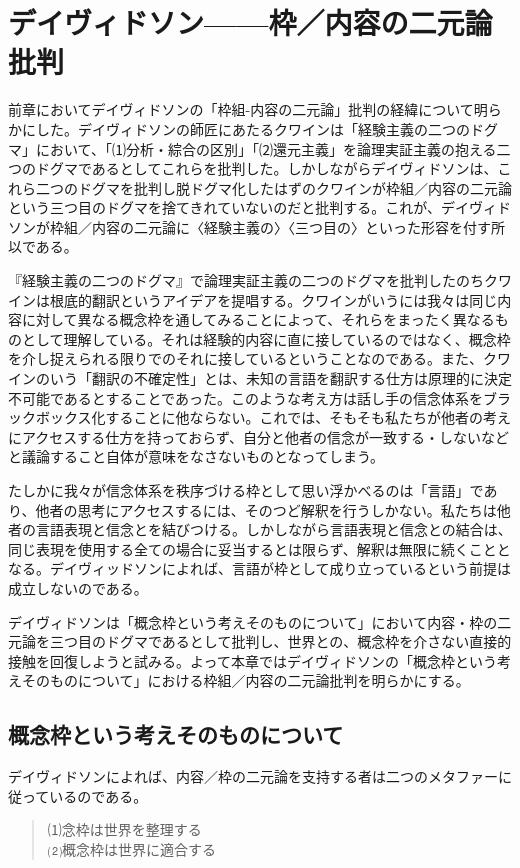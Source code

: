 \documentclass[b5j,twoside,twocolumn]{utarticle}
\begin{document}
\section{\tbaselineshift =4.0pt デイヴィドソン------枠／内容の二元論批判}
前章においてデイヴィドソンの「枠組-内容の二元論」批判の経緯について明らかにした。デイヴィドソンの師匠にあたるクワインは「経験主義の二つのドグマ」において、「⑴分析・綜合の区別」「⑵還元主義」を論理実証主義の抱える二つのドグマであるとしてこれらを批判した。しかしながらデイヴィドソンは、これら二つのドグマを批判し脱ドグマ化したはずのクワインが枠組／内容の二元論という三つ目のドグマを捨てきれていないのだと批判する。これが、デイヴィドソンが枠組／内容の二元論に〈経験主義の〉〈三つ目の〉といった形容を付す所以である。



『経験主義の二つのドグマ』で論理実証主義の二つのドグマを批判したのちクワインは根底的翻訳というアイデアを提唱する。クワインがいうには我々は同じ内容に対して異なる概念枠を通してみることによって、それらをまったく異なるものとして理解している。それは経験的内容に直に接しているのではなく、概念枠を介し捉えられる限りでのそれに接しているということなのである。また、クワインのいう「翻訳の不確定性」とは、未知の言語を翻訳する仕方は原理的に決定不可能であるとすることであった。このような考え方は話し手の信念体系をブラックボックス化することに他ならない。これでは、そもそも私たちが他者の考えにアクセスする仕方を持っておらず、自分と他者の信念が一致する・しないなどと議論すること自体が意味をなさないものとなってしまう。


たしかに我々が信念体系を秩序づける枠として思い浮かべるのは「言語」であり、他者の思考にアクセスするには、そのつど解釈を行うしかない。私たちは他者の言語表現と信念とを結びつける。しかしながら言語表現と信念との結合は、同じ表現を使用する全ての場合に妥当するとは限らず、解釈は無限に続くこととなる。デイヴィッドソンによれば、言語が枠として成り立っているという前提は成立しないのである。


デイヴィドソンは「概念枠という考えそのものについて」において内容・枠の二元論を三つ目のドグマであるとして批判し、世界との、概念枠を介さない直接的接触を回復しようと試みる。よって本章ではデイヴィドソンの「概念枠という考えそのものについて」における枠組／内容の二元論批判を明らかにする。
\subsection{概念枠という考えそのものについて}
デイヴィドソンによれば、内容／枠の二元論を支持する者は二つのメタファーに従っているのである。
\begin{quote}
⑴念枠は世界を整理する\\
⑵概念枠は世界に適合する
\end{quote}
\end{document}
